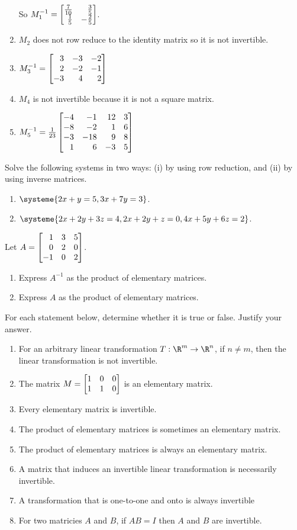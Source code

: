 \begin{exercises}
\begin{problist}
\begin{solution}
\begin{enumerate}
				So $M_{1}^{-1}=\mat{\frac{7}{10}&\frac{3}{5}\\
								 \frac{1}{5}&-\frac{2}{5}\\}$.
				\item $M_{2}$ does not row reduce to the identity matrix so it is not invertible.
				\item $M_{3}^{-1}=\mat{3&-3&-2\\2&-2&-1\\-3&4&2}$
				\item $M_{4}$ is not invertible because it is not a square matrix.
				\item $M_{5}^{-1}=\frac{1}{23}\mat{-4&-1&12&3\\-8&-2&1&6\\-3&-18&9&8\\1&6&-3&5}$
			\end{enumerate}
		\end{solution}

		\prob Solve the following systems in two ways: (i) by using row reduction,
		and (ii) by using inverse matrices.
		\begin{enumerate}
			\item $\systeme{2x+y=5,3x+7y=3}$.

			\item $\systeme{2x+2y+3z=4,2x+2y+z=0, 4x+5y+6z=2}$.
		\end{enumerate}

		\prob Let $A=\mat{1&3&5\\0&2&0\\-1&0&2}$.
		\begin{enumerate}
			\item Express $A^{-1}$ as the product of elementary matrices.

			\item Express $A$ as the product of elementary matrices.
		\end{enumerate}

		\prob For each statement below, determine whether it is true or false. Justify your answer.
		\begin{enumerate}
			\item For an arbitrary linear transformation $T:\R^{m}\to\R^{n}$,
				if $n \neq m$, then the linear transformation is
				not invertible.
			\item The matrix $M = \mat{1&0&0\\1&1&0}$ is an elementary
				matrix.
			\item Every elementary matrix is invertible.
			\item The product of elementary matrices is sometimes an elementary matrix.
			\item The product of elementary matrices is always an elementary matrix.
			\item A matrix that induces an invertible linear transformation is necessarily invertible.
			\item A transformation that is one-to-one and onto is always invertible
			\item For two matricies $A$ and $B$, if $AB=I$ then $A$ and $B$ are invertible.
		\end{enumerate}


\end{problist}
\end{exercises}
